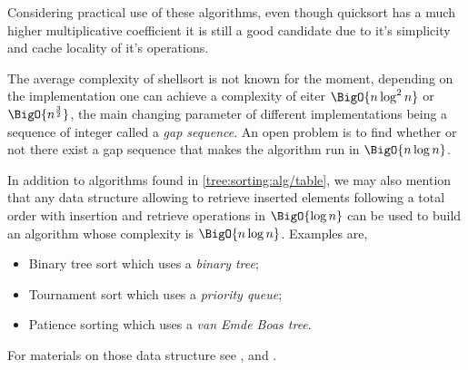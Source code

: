 Considering practical use of these algorithms, even though quicksort has a much higher multiplicative coefficient it is still a good candidate due to it's simplicity and cache locality of it's operations.

The average complexity of shellsort is not known for the moment, depending on the implementation one can achieve a complexity of eiter $\BigO{n \log^2 n}$ or $\BigO{n^{\frac{3}{2}}}$, the main changing parameter of different implementations being a sequence of integer called a \emph{gap sequence}. An open problem is to find whether or not there exist a gap sequence that makes the algorithm run in $\BigO{n \log n}$.

In addition to algorithms found in \ref{tree:sorting:alg/table}, we may also mention that any data structure allowing to retrieve inserted elements following a total order with insertion and retrieve operations in $\BigO{\log n}$ can be used to build an algorithm whose complexity is $\BigO{n \log n}$. Examples are,

\begin{itemize}
\item Binary tree sort which uses a \emph{binary tree};
\item Tournament sort which uses a \emph{priority queue};
\item Patience sorting which uses a \emph{van Emde Boas tree}.
\end{itemize}

For materials on those data structure see \cite{sleator1985self}, \cite{leiserson2001introduction} and \cite{van1975preserving}.